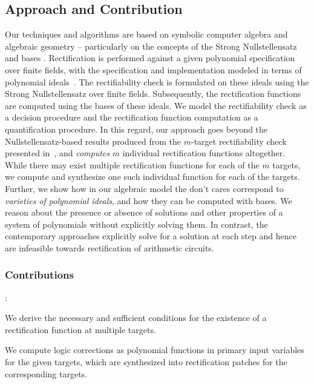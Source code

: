 \subsection{Approach and Contribution}
{\red Our techniques and algorithms are based on symbolic computer algebra
and algebraic geometry -- particularly on the concepts of the Strong
Nullstellensatz and \Grobner bases \cite{gb_book}. Rectification is 
performed against a given polynomial specification over finite fields, 
with the specification and implementation modeled in terms of polynomial 
ideals~\cite{gb_book}. The rectifiability check is formulated on these 
ideals using the Strong Nullstellensatz over finite fields. Subsequently, 
the rectification functions are computed using the \Grobner bases of these ideals. 
We model the rectifiability check as a decision procedure and the rectification 
function computation as a quantification procedure. 
In this regard, our approach goes beyond the Nullstellensatz-based 
results produced from the $m$-target rectifiability check presented 
in~\cite{Vkrao:ISQED21}, and {\it computes} $m$ individual rectification 
functions altogether. While there may exist multiple rectification functions 
for each of the $m$ targets, we compute and synthesize one such individual 
function for each of the targets. Further, we show how in our algebraic model 
the don't cares correspond to {\it varieties of polynomial ideals}, and how 
they can be computed with \Grobner bases.
We reason about the presence or absence of solutions 
and other properties of a system of polynomials without explicitly solving them. 
In contrast, the contemporary approaches explicitly solve for a solution at 
each step and hence are infeasible towards rectification of arithmetic circuits.

\subsubsection{Contributions}:
\bi
\item We derive the necessary and sufficient conditions
for the existence of a rectification function at multiple targets.

\item We compute logic corrections as polynomial functions in primary input variables
for the given targets, which are synthesized into rectification patches for the corresponding targets.

}

